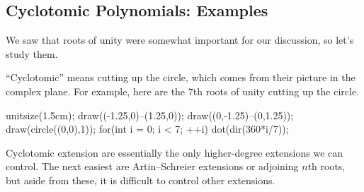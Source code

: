 \subsection{Cyclotomic Polynomials: Examples}
We saw that roots of unity were somewhat important for our discussion, so let's study them.
\begin{remark}
	``Cyclotomic'' means cutting up the circle, which comes from their picture in the complex plane. For example, here are the $7$th roots of unity cutting up the circle.
	\begin{center}
		\begin{asy}
			unitsize(1.5cm);
			draw((-1.25,0)--(1.25,0));
			draw((0,-1.25)--(0,1.25));
			draw(circle((0,0),1));
			for(int i = 0; i < 7; ++i)
				dot(dir(360*i/7));
		\end{asy}
	\end{center}
\end{remark}
Cyclotomic extension are essentially the only higher-degree extensions we can control. The next easiest are Artin--Schreier extensions or adjoining $n$th roots, but aside from these, it is difficult to control other extensions.

